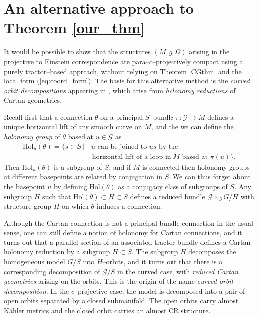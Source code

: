 \section{An alternative approach to Theorem \ref{our_thm}}

It would be possible to show that the structures $(M,g,\Omega)$ arising in the projective to Einstein correspondence are para--$c$--projectively compact using a purely tractor--based approach, without relying on Theorem \ref{CGthm} and the local form (\ref{eq:coord_form}). The basis for this alternative method is the \textit{curved orbit decompositions} appearing in \cite{CGH-duke}, which arise from \textit{holonomy reductions} of Cartan geometries.

Recall first that a connection $\theta$ on a principal $S$--bundle $\pi:\mathcal{G}\rightarrow M$ defines a unique horizontal lift of any smooth curve on $M$, and the we can define the \textit{holonomy group} of $\theta$ based at $u\in \mathcal{G}$ as
\begin{align*}
\mathrm{Hol}_u(\theta)=\{s\in S\ |&\ u\mbox{ can be joined to }us\mbox{ by the}\\
&\mbox{ horizontal lift of a loop in }M\mbox{ based at }\pi(u)\}.
\end{align*}
Then $\mathrm{Hol}_u(\theta)$ is a subgroup of $S$, and if $M$ is connected then holonomy groups at different basepoints are related by conjugation in $S$. We can thus forget about the basepoint $u$ by defining $\mathrm{Hol}(\theta)$ as a conjugacy class of subgroups of $S$. Any subgroup ${H}$ such that $\mathrm{Hol}(\theta)\subset 
{H}\subset S$ defines a reduced bundle $\mathcal{G}\times_S G/{H}$ with structure group $H$ on which $\theta$ induces a connection. %

Although the Cartan connection is not a principal bundle connection in the usual sense, one can still define a notion of holonomy for Cartan connections, and it turns out \cite{CGH-duke} that a parallel section of an associated tractor bundle defines a Cartan holonomy reduction by a subgroup $H\subset S$. The subgroup $H$ decomposes the homogeneous model $G/S$ into $H$--orbits, and it turns out that there is a corresponding decomposition of $\mathcal{G}/S$ in the curved case, with \textit{reduced Cartan geometries} arising on the orbits. This is the origin of the name \textit{curved orbit decomposition}. In the $c$--projective case, the model is decomposed into a pair of open orbits separated by a closed submanifold. The open orbits carry almost K\"ahler metrics and the closed orbit carries an almost CR structure.

